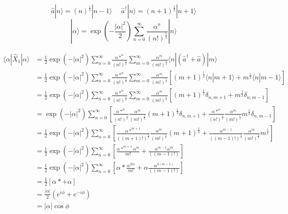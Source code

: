 \documentclass[a4paper,11pt]{article}
\begin{document}
$$\hat{a}|n\rangle = (n)^\frac{1}{2}|n-1\rangle~~~~~~\hat{a}^\dag|n\rangle = (n+1)^\frac{1}{2}|n+1\rangle$$
$$|\alpha\rangle = \exp\left(-\frac{|\alpha|^2}{2}\right) \sum_{n=0}^{\infty}\frac{\alpha^n}{(n!)^\frac{1}{2}}|n\rangle$$

\begin{equation*}
\begin{split}
\langle\alpha|\hat{X}_1|\alpha\rangle & =\frac{1}{2} \exp\left(-|\alpha|^2\right) \sum_{n=0}^{\infty}\frac{\alpha*^n}{(n!)^\frac{1}{2}}  \sum_{m=0}^{\infty}\frac{\alpha^m}{(m!)^\frac{1}{2}}\langle n|(\hat{a}^\dag+\hat{a}) |m\rangle \\
& = \frac{1}{2} \exp\left(-|\alpha|^2\right) \sum_{n=0}^{\infty}\frac{\alpha*^n}{(n!)^\frac{1}{2}}  \sum_{m=0}^{\infty}\frac{\alpha^m}{(m!)^\frac{1}{2}}\left[(m+1)^\frac{1}{2}\langle n|m+1\rangle+m^\frac{1}{2}\langle n |m-1\rangle\right] \\
& = \frac{1}{2} \exp\left(-|\alpha|^2\right) \sum_{n=0}^{\infty}\frac{\alpha*^n}{(n!)^\frac{1}{2}}  \sum_{m=0}^{\infty}\frac{\alpha^m}{(m!)^\frac{1}{2}}\left[(m+1)^\frac{1}{2}\delta_{n,m+1}+m^\frac{1}{2}\delta_{n,m-1}\right] \\
& = \exp\left(-|\alpha|^2\right) \sum_{n=0}^{\infty}\left[\frac{\alpha*^n}{(n!)^\frac{1}{2}}  \frac{\alpha^m}{(m!)^\frac{1}{2}}(m+1)^\frac{1}{2}\delta_{n,m+1}+\frac{\alpha*^n}{(n!)^\frac{1}{2}}  \frac{\alpha^m}{(m!)^\frac{1}{2}}m^\frac{1}{2}\delta_{n,m-1}\right] \\
& = \frac{1}{2} \exp\left(-|\alpha|^2\right) \sum_{n=0}^{\infty}\left[\frac{\alpha*^{m+1}}{((m+1)!)^\frac{1}{2}}  \frac{\alpha^m}{(m!)^\frac{1}{2}}(m+1)^\frac{1}{2}+\frac{\alpha^{m-1}}{((m-1)!)^\frac{1}{2}}  \frac{\alpha^m}{(m!)^\frac{1}{2}}m^\frac{1}{2}\right] \\
& = \frac{1}{2} \exp\left(-|\alpha|^2\right) \sum_{n=0}^{\infty}\left[\frac{\alpha*^{m+1}\alpha^m}{m!}  +\frac{\alpha^{m-1}\alpha^m}{((m-1)!)}\right] \\
& = \frac{1}{2} \exp\left(-|\alpha|^2\right) \sum_{n=0}^{\infty}\left[\alpha*\frac{\alpha^{2m}}{m!}  +\alpha\frac{\alpha^{2(m-1)}}{((m-1)!)}\right] \\
& = \frac{1}{2} \left[\alpha* +\alpha\right] \\
& = \frac{|\alpha|}{2}(e^{i\phi} + e^{-i\phi}) \\
& = |\alpha|\cos\phi
\end{split}
\end{equation*}
\end{document}
